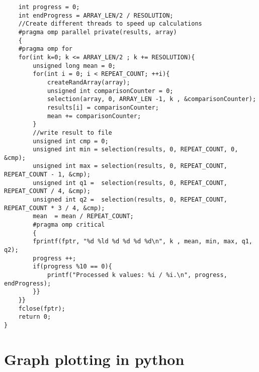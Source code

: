 \documentclass[11pt]{article}
\begin{document}
\begin{lstlisting}
    int progress = 0;
    int endProgress = ARRAY_LEN/2 / RESOLUTION;
    //Create different threads to speed up calculations
    #pragma omp parallel private(results, array)
    {
    #pragma omp for
    for(int k=0; k <= ARRAY_LEN/2 ; k += RESOLUTION){  
        unsigned long mean = 0;    
        for(int i = 0; i < REPEAT_COUNT; ++i){
            createRandArray(array);
            unsigned int comparisonCounter = 0;
            selection(array, 0, ARRAY_LEN -1, k , &comparisonCounter);
            results[i] = comparisonCounter;
            mean += comparisonCounter;
        }  
        //write result to file
        unsigned int cmp = 0;
        unsigned int min = selection(results, 0, REPEAT_COUNT, 0, &cmp);
        unsigned int max = selection(results, 0, REPEAT_COUNT, REPEAT_COUNT - 1, &cmp);
        unsigned int q1 =  selection(results, 0, REPEAT_COUNT, REPEAT_COUNT / 4, &cmp);
        unsigned int q2 =  selection(results, 0, REPEAT_COUNT, REPEAT_COUNT * 3 / 4, &cmp);
        mean  = mean / REPEAT_COUNT;
        #pragma omp critical
        {
        fprintf(fptr, "%d %ld %d %d %d %d\n", k , mean, min, max, q1, q2);
        progress ++;
        if(progress %10 == 0){
            printf("Processed k values: %i / %i.\n", progress, endProgress);
        }}     
    }}
    fclose(fptr);
    return 0;
}

\end{lstlisting}

\section{Graph plotting in python}\label{appendix:graph}
\end{document}
